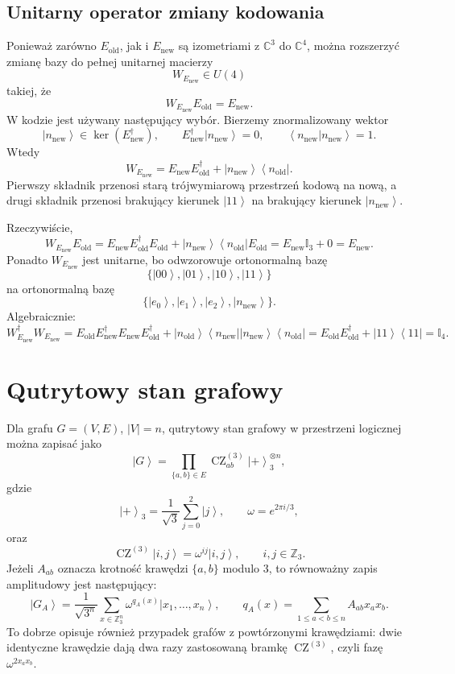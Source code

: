 \documentclass[11pt,a4paper]{article}
\newcommand{\C}{\mathbb{C}}
\newcommand{\Z}{\mathbb{Z}}
\newcommand{\id}{\mathbb{I}}
\newcommand{\Eold}{E_{\mathrm{old}}}
\newcommand{\Enew}{E_{\mathrm{new}}}
\newcommand{\w}{\omega}
\newcommand{\CZ}{\operatorname{CZ}}
\newcommand{\ket}[1]{\left|#1\right\rangle}
\newcommand{\bra}[1]{\left\langle#1\right|}
\newcommand{\braket}[1]{\left\langle#1\right\rangle}
\begin{document}
\subsection{Unitarny operator zmiany kodowania}

Ponieważ zarówno \(\Eold\), jak i \(\Enew\) są izometriami z \(\C^3\) do
\(\C^4\), można rozszerzyć zmianę bazy do pełnej unitarnej macierzy
\[
    W_{\Enew}\in U(4)
\]
takiej, że
\[
    W_{\Enew}\Eold=\Enew.
\]
W kodzie jest używany następujący wybór. Bierzemy znormalizowany wektor
\[
    \ket{n_{\mathrm{new}}}\in\ker(\Enew^\dagger),
    \qquad
    \Enew^\dagger\ket{n_{\mathrm{new}}}=0,
    \qquad
    \braket{n_{\mathrm{new}}|n_{\mathrm{new}}}=1.
\]
Wtedy
\[
    \boxed{
    W_{\Enew}
    =
    \Enew\Eold^\dagger
    +
    \ket{n_{\mathrm{new}}}\bra{n_{\mathrm{old}}}
    }.
\]
Pierwszy składnik przenosi starą trójwymiarową przestrzeń kodową na nową,
a drugi składnik przenosi brakujący kierunek \(\ket{11}\) na brakujący
kierunek \(\ket{n_{\mathrm{new}}}\).

Rzeczywiście,
\[
    W_{\Enew}\Eold
    =
    \Enew\Eold^\dagger\Eold
    +
    \ket{n_{\mathrm{new}}}\bra{n_{\mathrm{old}}}\Eold
    =
    \Enew\id_3+0
    =
    \Enew.
\]
Ponadto \(W_{\Enew}\) jest unitarne, bo odwzorowuje ortonormalną bazę
\[
    \{\ket{00},\ket{01},\ket{10},\ket{11}\}
\]
na ortonormalną bazę
\[
    \{\ket{e_0},\ket{e_1},\ket{e_2},\ket{n_{\mathrm{new}}}\}.
\]
Algebraicznie:
\[
    W_{\Enew}^\dagger W_{\Enew}
    =
    \Eold\Enew^\dagger\Enew\Eold^\dagger
    +
    \ket{n_{\mathrm{old}}}\bra{n_{\mathrm{new}}}
    \ket{n_{\mathrm{new}}}\bra{n_{\mathrm{old}}}
    =
    \Eold\Eold^\dagger
    +
    \ket{11}\bra{11}
    =
    \id_4.
\]

\section{Qutrytowy stan grafowy}

Dla grafu \(G=(V,E)\), \(|V|=n\), qutrytowy stan grafowy w przestrzeni
logicznej można zapisać jako
\[
    \ket{G}
    =
    \prod_{\{a,b\}\in E}\CZ_{ab}^{(3)}
    \ket{+}_3^{\otimes n},
\]
gdzie
\[
    \ket{+}_3
    =
    \frac{1}{\sqrt{3}}
    \sum_{j=0}^{2}\ket{j},
    \qquad
    \w=e^{2\pi i/3},
\]
oraz
\[
    \CZ^{(3)}\ket{i,j}
    =
    \w^{ij}\ket{i,j},
    \qquad
    i,j\in\Z_3.
\]
Jeżeli \(A_{ab}\) oznacza krotność krawędzi \(\{a,b\}\) modulo \(3\), to
równoważny zapis amplitudowy jest następujący:
\[
    \boxed{
    \ket{G_A}
    =
    \frac{1}{\sqrt{3^n}}
    \sum_{x\in\Z_3^n}
    \w^{q_A(x)}
    \ket{x_1,\ldots,x_n}
    },
    \qquad
    q_A(x)=\sum_{1\le a<b\le n} A_{ab}x_ax_b.
\]
To dobrze opisuje również przypadek grafów z powtórzonymi krawędziami: dwie
identyczne krawędzie dają dwa razy zastosowaną bramkę \(\CZ^{(3)}\), czyli
fazę \(\w^{2x_ax_b}\).
\end{document}
